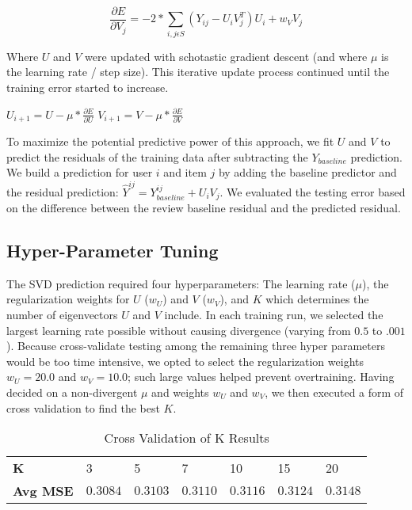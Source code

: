 \documentclass[12pt]{article}
\begin{document}
$$ \frac{\partial E}{\partial V_j} = -2 * \sum\limits_{i,j \epsilon S} (Y_{ij} - U_i V_j^T) U_i + w_V V_j$$


Where $U$ and $V$ were updated with schotastic gradient descent (and where $\mu$ is the learning rate / step size). This iterative update process continued until the training error started to increase.

\begin{center}
$ U_{i+1} = U - \mu * \frac{\partial E}{\partial U}$ \hspace{2cm} $V_{i+1} = V - \mu * \frac{\partial E}{\partial V}$
\end{center}

To maximize the potential predictive power of this approach, we fit $U$ and $V$ to predict the residuals of the training data after subtracting the $Y_{baseline}$ prediction. We build a prediction for user $i$ and item $j$ by adding the baseline predictor and the residual prediction: $\hat{Y}^{ij} = Y_{baseline}^{ij} + U_i V_j$. We evaluated the testing error based on the difference between the review baseline residual and the predicted residual.

\subsection*{Hyper-Parameter Tuning}
The SVD prediction required four hyperparameters: The learning rate ($\mu$), the regularization weights for $U$ ($w_U$) and $V$ ($w_V$), and $K$ which determines the number of eigenvectors $U$ and $V$ include. In each training run, we selected the largest learning rate possible without causing divergence (varying from $0.5$ to $.001$). Because cross-validate testing among the remaining three hyper parameters would be too time intensive, we opted to select the regularization weights $w_U = 20.0$ and $w_V = 10.0$; such large values helped prevent overtraining. Having decided on a non-divergent $\mu$ and weights $w_U$ and $w_V$, we then executed a form of cross validation to find the best $K$. \\

\begin{table}[ht!]
\centering
\caption{Cross Validation of K Results}
\vspace{2mm}
\begin{tabular}{lllllll}
\hline
\textbf{K}              & 3          & 5             & 7             & 10        & 15        & 20 \\
\textbf{Avg MSE}        & $0.3084$   & $0.3103$      & $0.3110$      & $0.3116$  & $0.3124$  & $0.3148$\\ \hline
\end{tabular}
\end{table}
\end{document}
